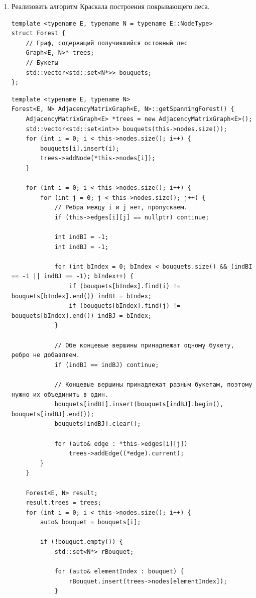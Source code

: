 \documentclass[a4paper,14pt]{extarticle}
\begin{document}
\begin{enumerate}[1.]
    \item Реализовать алгоритм Краскала построения покрывающего леса.\\
        \begin{verbatim}
template <typename E, typename N = typename E::NodeType>
struct Forest {
    // Граф, содержащий получившийся остовный лес
    Graph<E, N>* trees;
    // Букеты
    std::vector<std::set<N*>> bouquets;
};
        \end{verbatim}
        \begin{verbatim}
template <typename E, typename N>
Forest<E, N> AdjacencyMatrixGraph<E, N>::getSpanningForest() {
    AdjacencyMatrixGraph<E> *trees = new AdjacencyMatrixGraph<E>();
    std::vector<std::set<int>> bouquets(this->nodes.size());
    for (int i = 0; i < this->nodes.size(); i++) {
        bouquets[i].insert(i);
        trees->addNode(*this->nodes[i]);
    }

    for (int i = 0; i < this->nodes.size(); i++) {
        for (int j = 0; j < this->nodes.size(); j++) {
            // Ребра между i и j нет, пропускаем.
            if (this->edges[i][j] == nullptr) continue;

            int indBI = -1;
            int indBJ = -1;

            for (int bIndex = 0; bIndex < bouquets.size() && (indBI == -1 || indBJ == -1); bIndex++) {
                if (bouquets[bIndex].find(i) != bouquets[bIndex].end()) indBI = bIndex;
                if (bouquets[bIndex].find(j) != bouquets[bIndex].end()) indBJ = bIndex;
            }

            // Обе концевые вершины принадлежат одному букету, ребро не добавляем.
            if (indBI == indBJ) continue;

            // Концевые вершины принадлежат разным букетам, поэтому нужно их объединить в один.
            bouquets[indBI].insert(bouquets[indBJ].begin(), bouquets[indBJ].end());
            bouquets[indBJ].clear();

            for (auto& edge : *this->edges[i][j])
                trees->addEdge((*edge).current);
        }
    }

    Forest<E, N> result;
    result.trees = trees;
    for (int i = 0; i < this->nodes.size(); i++) {
        auto& bouquet = bouquets[i];

        if (!bouquet.empty()) {
            std::set<N*> rBouquet;

            for (auto& elementIndex : bouquet) {
                rBouquet.insert(trees->nodes[elementIndex]);
            }


\end{verbatim}
\end{enumerate}
\end{document}
